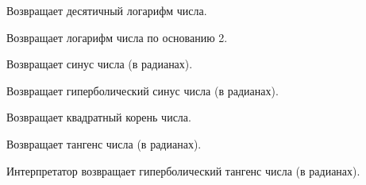 \begin{methodlist}
  Возвращает десятичный логарифм числа.

  Возвращает логарифм числа по основанию 2.

  Возвращает синус числа (в радианах).

  Возвращает гиперболический синус числа (в радианах).

  Возвращает квадратный корень числа.

  Возвращает тангенс числа (в радианах).

  	Интерпретатор возвращает гиперболический тангенс числа (в радианах).
\end{methodlist}